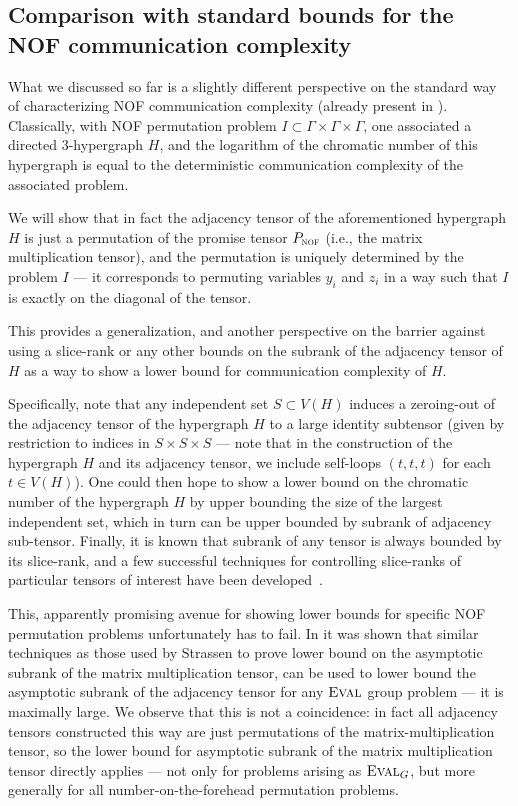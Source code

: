 \documentclass[10pt,a4paper]{article}
\newcommand{\eval}{\textsc{Eval}}
\newcommand{\mmP}{P_{\textsc{nof}}}
\newcommand{\jnote}[1]{\todo[inline, color=blue!30!white]{#1 \\ -\textsc{Jarek}}}
\begin{document}
\subsection{Comparison with standard bounds for the NOF communication complexity}
What we discussed so far is a slightly different perspective on the standard way of characterizing NOF communication complexity (already present in \cite{CFL83}). Classically, with  NOF permutation problem $I \subset \Gamma \times \Gamma \times \Gamma$, one associated a directed 3-hypergraph $H$, and the logarithm of the chromatic number of this hypergraph is equal to the deterministic communication complexity of the associated problem.

We will show that in fact the adjacency tensor of the aforementioned hypergraph $H$ is just a permutation of the promise tensor $\mmP$ (i.e., the matrix multiplication tensor), and the permutation is uniquely determined by the problem $I$ --- it corresponds to permuting variables $y_i$ and $z_i$ in a way such that $I$ is exactly on the diagonal of the tensor.

This provides a generalization, and another perspective on the barrier against using a slice-rank or any other bounds on the subrank of the adjacency tensor of $H$ as a way to show a lower bound for communication complexity of $H$. 

Specifically, note that any independent set $S \subset V(H)$ induces a zeroing-out of the adjacency tensor of the hypergraph $H$ to a large identity subtensor (given by restriction to indices in $S \times S \times S$ --- note that in the construction of the hypergraph $H$ and its adjacency tensor, we include self-loops $(t,t,t)$ for each $t \in V(H)$). One could then hope to show a lower bound on the chromatic number of the hypergraph $H$ by upper bounding the size of the largest independent set, which in turn can be upper bounded by subrank of adjacency sub-tensor. Finally, it is known that subrank of any tensor is always bounded by its slice-rank, and a few successful techniques for controlling slice-ranks of particular tensors of interest have been developed~\cite{T16,BCHGNSU17}.

This, apparently promising avenue for showing lower bounds for specific NOF permutation problems unfortunately has to fail. In \cite{CFTZ21} it was shown that similar techniques as those used by Strassen to prove lower bound on the asymptotic subrank of the matrix multiplication tensor, can be used to lower bound the asymptotic subrank of the adjacency tensor for any $\textsc{Eval}$ group problem --- it is maximally large. We observe that this is not a coincidence: in fact all adjacency tensors constructed this way are just permutations of the matrix-multiplication tensor, so the lower bound for asymptotic subrank of the matrix multiplication tensor directly applies --- not only for problems arising as $\eval_G$, but more generally for all number-on-the-forehead permutation problems.
\end{document}
